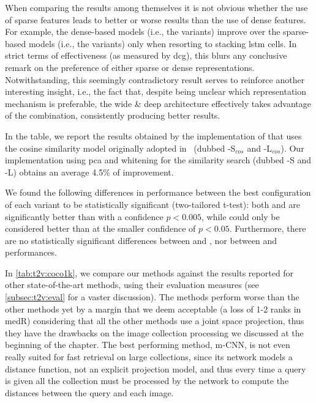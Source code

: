 When comparing the \ttv{} results among themselves it is not obvious whether the use of sparse features leads to better or worse results than the use of dense features.
For example, the dense-based models (i.e.,  the \densettv{} variants) improve over the sparse-based models (i.e.,  the \sparsettv{} variants) only when resorting to stacking \gls{lstm} cells.
In strict terms of effectiveness (as measured by \gls{dcg}), this blurs any conclusive remark on the preference of either sparse or dense representations.
Notwithstanding, this seemingly contradictory result serves to reinforce another interesting insight, i.e.,  the fact that, despite being unclear which representation mechanism is preferable, the wide \& deep architecture effectively takes advantage of the combination, consistently producing better results.


In the table, we report the results obtained by the implementation of \wordvisual{} that uses the cosine similarity model originally adopted in~\cite{dong2018predicting} (dubbed \wordvisual{}-S$_{cos}$ and \wordvisual{}-L$_{cos}$).
Our implementation using \gls{pca} and whitening for the similarity search (dubbed \wordvisual{}-S and \wordvisual{}-L) obtains an average 4.5\% of improvement.

We found the following differences in performance between the best configuration of each variant to be statistically significant (two-tailored t-test): both \densettv{} and \widedeepttv{} are significantly better than \sparsettv{} with a confidence $p<0.005$, while \widedeepttv{} could only be considered better than \wordvisual{} at the smaller confidence of $p<0.05$.
Furthermore, there are no statistically significant differences between \widedeepttv{} and \densettv{}, nor between \densettv{} and \wordvisual{} performances.

In \ref{tab:t2v:coco1k}, we compare our methods against the results reported for other state-of-the-art methods, using their evaluation measures (see \ref{subsec:t2v:eval} for a vaster discussion).
The \ttv{} methods perform worse than the other methods yet by a margin that we deem acceptable (a loss of 1-2 ranks in \gls{medR}) considering that all the other methods use a joint space projection, thus they have the drawbacks on the image collection processing we discussed at the beginning of the chapter. %
The best performing method, m-CNN, is not even really suited for fast retrieval on large collections, since its network models a distance function, not an explicit projection model, and thus every time a query is given all the collection must be processed by the network to compute the distances between the query and each image.

